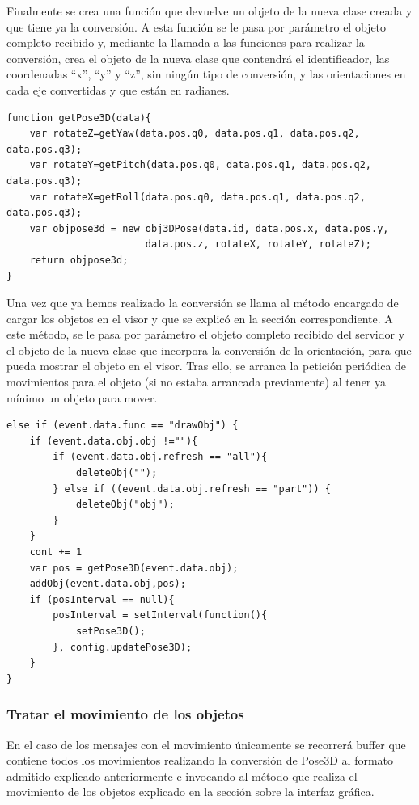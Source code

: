 Finalmente se crea una función que devuelve un objeto de la nueva clase creada y que tiene ya la conversión. A esta función se le pasa por parámetro el objeto completo recibido y, mediante la llamada a las funciones para realizar la conversión, crea el objeto de la nueva clase que contendrá el identificador, las coordenadas ``x'', ``y'' y ``z'', sin ningún tipo de conversión, y las orientaciones en cada eje convertidas y que están en radianes.

\begin{lstlisting}[caption= Función que devuelve la posición tras la conversión, label=cod.posicionconvertida]
function getPose3D(data){
	var rotateZ=getYaw(data.pos.q0, data.pos.q1, data.pos.q2, data.pos.q3);
	var rotateY=getPitch(data.pos.q0, data.pos.q1, data.pos.q2, data.pos.q3);
	var rotateX=getRoll(data.pos.q0, data.pos.q1, data.pos.q2, data.pos.q3);
	var objpose3d = new obj3DPose(data.id, data.pos.x, data.pos.y,
						data.pos.z, rotateX, rotateY, rotateZ);
	return objpose3d;
}
\end{lstlisting}

Una vez que ya hemos realizado la conversión se llama al método encargado de cargar los objetos en el visor y que se explicó en la sección correspondiente. A este método, se le pasa por parámetro el objeto completo recibido del servidor y el objeto de la nueva clase que incorpora la conversión de la orientación, para que pueda mostrar el objeto en el visor. Tras ello, se arranca la petición periódica de movimientos para el objeto (si no estaba arrancada previamente) al tener ya mínimo un objeto para mover.

\begin{lstlisting}[caption= Código para tratar los mensajes con el objeto 3D, label=cod.tratarobjetos]
else if (event.data.func == "drawObj") {
	if (event.data.obj.obj !=""){
		if (event.data.obj.refresh == "all"){
			deleteObj("");
		} else if ((event.data.obj.refresh == "part")) {
			deleteObj("obj");
		}
	}
	cont += 1
	var pos = getPose3D(event.data.obj);
	addObj(event.data.obj,pos);
	if (posInterval == null){
		posInterval = setInterval(function(){
			setPose3D();
		}, config.updatePose3D);
	}
}	
\end{lstlisting}

\subsubsection{Tratar el movimiento de los objetos}
En el caso de los mensajes con el movimiento únicamente se recorrerá buffer que contiene todos los movimientos realizando la conversión de Pose3D al formato admitido explicado anteriormente e invocando al método que realiza el movimiento de los objetos explicado en la sección sobre la interfaz gráfica. 

